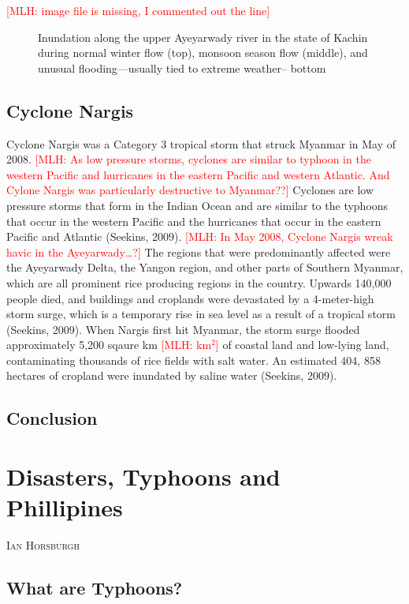 \documentclass{book}\usepackage{knitr}
\makeatletter
\newcommand{\red}[1]{\textcolor{red}{[MLH: #1]}}
\newcommand{\chapterauthor}[1]{%
  {\parindent0pt\vspace*{-25pt}%
  \linespread{1.1}\large\scshape#1%
  \par\nobreak\vspace*{35pt}}
  \@afterheading%
}
\makeatother
\begin{document}
\begin{knitrout}
\begin{kframe}
{\red{image file is missing, I commented out the line}
\begin{figure}
\caption{Inundation along the upper Ayeyarwady river in the state of Kachin during normal winter flow (top), monsoon season flow (middle), and unusual flooding—usually tied to extreme weather-- bottom}
\end{figure}

\section{Cyclone Nargis}
Cyclone Nargis was a Category 3 tropical storm that struck Myanmar in May of 2008. \red{As low pressure storms, cyclones are similar to typhoon in the western Pacific and hurricanes in the eastern Pacific and western Atlantic. And Cylone Nargis was particularly destructive to Myanmar??} Cyclones are low pressure storms that form in the Indian Ocean and are similar to the typhoons that occur in the western Pacific and the hurricanes that occur in the eastern Pacific and Atlantic (Seekins, 2009). \red{In May 2008, Cyclone Nargis wreak havic in the Ayeyarwady\ldots?} The regions that were predominantly affected were the Ayeyarwady Delta, the Yangon region, and other parts of Southern Myanmar, which are all prominent rice producing regions in the country. Upwards 140,000 people died, and buildings and croplands were devastated by a 4-meter-high storm surge, which is a temporary rise in sea level as a result of a tropical storm (Seekins, 2009). 
	When Nargis first hit Myanmar, the storm surge flooded approximately 5,200 sqaure km \red{km$^2$} of coastal land and low-lying land, contaminating thousands of rice fields with salt water. An estimated 404, 858 hectares of cropland were inundated by saline water (Seekins, 2009). 

\section{Conclusion}




\chapter{Disasters, Typhoons and Phillipines}

\chapterauthor{Ian Horsburgh}

\section{What are Typhoons?}



}
\end{kframe}
\end{knitrout}
\end{document}
